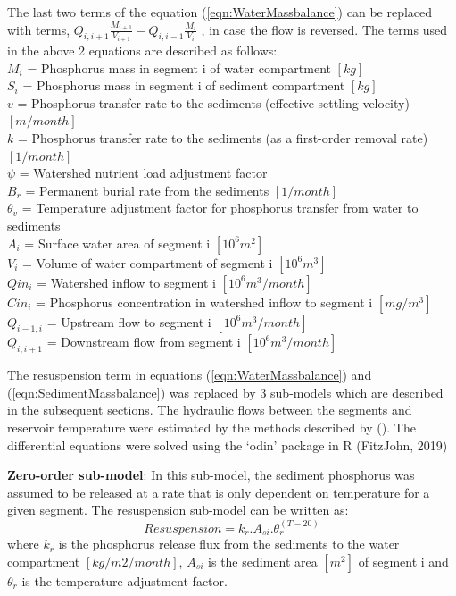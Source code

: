 \documentclass[fleqn]{article}
\newcommand{\mycite}[1]{\citeauthor{#1} (\citeyear{#1})}
\begin{document}
The last two terms of the equation (\ref{eqn:WaterMassbalance}) can be replaced with terms, $Q_{i,i+1}\frac{M_{i+1}}{V_{i+1}}-Q_{i,i-1}\frac{M_i}{V_i}$ , in case the flow is reversed. The terms used in the above 2 equations are described as follows:\\
$M_i$ = Phosphorus mass in segment i of water compartment $[kg]$ \\
$S_i$ = Phosphorus mass in segment i of sediment compartment $[kg]$ \\
$v$ = Phosphorus transfer rate to the sediments (effective settling velocity) $[m/month]$\\
$k$ = Phosphorus transfer rate to the sediments (as a first-order removal rate) $[1/month]$\\
$\psi$ = Watershed nutrient load adjustment factor\\$B_r$ = Permanent burial rate from the sediments $[1/month]$\\
$\theta_v$ = Temperature adjustment factor for phosphorus transfer from water to sediments\\
$A_i$ = Surface water area of segment i $[10^6 m^2]$\\$V_i$ = Volume of water compartment of segment i $[10^6 m^3]$ \\
$Qin_i$ = Watershed inflow to segment i $[10^6 m^3/month]$ \\
$Cin_i$ = Phosphorus concentration in watershed inflow to segment i $[mg/m^3]$\\
$Q_{i-1,i}$ = Upstream flow to segment i $[10^6m^3/month]$ \\
$Q_{i,i+1}$ = Downstream flow from segment i $[10^6m^3/month]$

The resuspension term in equations (\ref{eqn:WaterMassbalance}) and (\ref{eqn:SedimentMassbalance}) was replaced by 3 sub-models which are described in the subsequent sections. The hydraulic flows between the segments and reservoir temperature were estimated by the methods described by \mycite{DelGuidice2019}. The differential equations were solved using the ‘odin’ package in R (FitzJohn, 2019)

\textbf{Zero-order sub-model}: In this sub-model, the sediment phosphorus was assumed to be released at a rate that is only dependent on temperature for a given segment. The resuspension sub-model can be written as:
\begin{equation}
    Resuspension = k_r.A_{si}.\theta_r^{(T-20)}
    \label{eqn:ZeroOrderModel}
\end{equation}
where $k_r$ is the phosphorus release flux from the sediments to the water compartment $[kg/m2/month]$, $A_{si}$ is the sediment area $[m^2]$ of segment i and $\theta_r$ is the temperature adjustment factor. 
\end{document}
